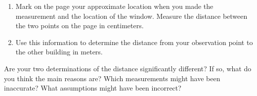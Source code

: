 \begin{enumerate}
\answerspace{1in}

\item Mark on the page your approximate location when you made the
measurement and the location of the window. Measure the distance between
the two points on the page in centimeters.

\answerspace{1in}

\pagebreak[3]
\item Use this information to determine the distance from your
observation point to the other building in meters.

\answerspace{1in}

\end{enumerate}

Are your two determinations of the distance significantly
different?  If so, what do you think the main reasons are?  Which
measurements might have been inaccurate?  What assumptions might
have been incorrect?

\vskip 2in

%
%
%
%
%
%
%
%
%
%
%
%
%
%
